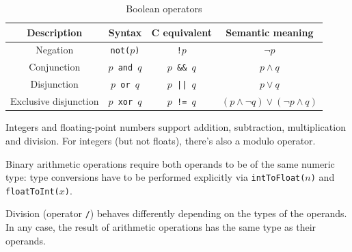 \documentclass[UdineBachThesis,american,11pt]{PhdThesis}
\begin{document}
  \begin{table}[H]
    \centering

    \begin{tabular}{|c|c|c|c|}
      \hline

      Description &
      Syntax &
      C equivalent &
      Semantic meaning \\
      \hline

      Negation &
      \texttt{not($p$)} &
      \texttt{!$p$} &
      $\lnot p$ \\

      Conjunction &
      \texttt{$p$ and $q$} &
      \texttt{$p$ \&\& $q$} &
      $p \land q$ \\

      Disjunction &
      \texttt{$p$ or $q$} &
      \texttt{$p$ || $q$} &
      $p \lor q$ \\

      Exclusive disjunction &
      \texttt{$p$ xor $q$} &
      \texttt{$p$ != $q$} &
      $\left(p \land \lnot q\right) \lor \left(\lnot p \land q\right)$ \\
      \hline
    \end{tabular}

    \caption{Boolean operators}
  \end{table}

  \pagebreak

  Integers and floating-point numbers support addition, subtraction,
  multiplication and division. For integers (but not floats), there's also a
  modulo operator.

  Binary arithmetic operations require both operands to be of the same numeric
  type: type conversions have to be performed explicitly via
  \mbox{\texttt{intToFloat($n$)}} and \mbox{\texttt{floatToInt($x$)}}.

  Division (operator \texttt{/}) behaves differently depending on the types of
  the operands. In any case, the result of arithmetic operations has the same
  type as their operands.
\end{document}
